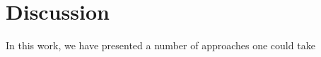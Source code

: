% 
% 
% 
% 
% 
% 
% 
% 
% 
% 
% 
% 
% 
% 
% 
% 
% 
% 
% 
% 



\section{Discussion}


In this work, we have presented a number of approaches one could take 



%

%



